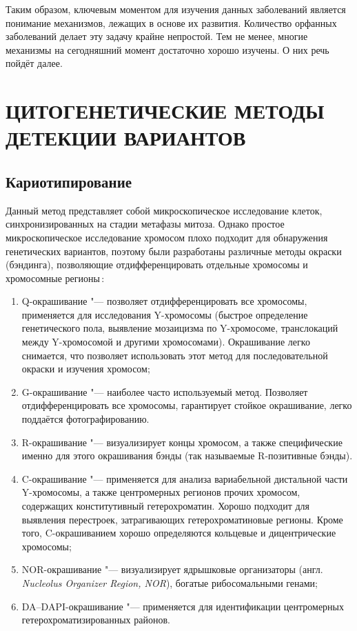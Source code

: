 \documentclass[12pt, twoside, a4paper]{article}
\newcommand{\engterm}[1]{англ. \textenglish{\textit{#1}}}
\begin{document}
Таким образом, ключевым моментом для изучения данных заболеваний является понимание механизмов, лежащих в основе их развития.
Количество орфанных заболеваний делает эту задачу крайне непростой.
Тем не менее, многие механизмы на сегодняшний момент достаточно хорошо изучены.
О них речь пойдёт далее.

\section*{ЦИТОГЕНЕТИЧЕСКИЕ МЕТОДЫ ДЕТЕКЦИИ ВАРИАНТОВ}

\subsection*{Кариотипирование}

Данный метод представляет собой микроскопическое исследование клеток, синхронизированных на стадии метафазы митоза.
Однако простое микроскопическое исследование хромосом плохо подходит для обнаружения генетических вариантов, поэтому были разработаны различные методы окраски (бэндинга), позволяющие отдифференцировать отдельные хромосомы и хромосомные регионы\,\cite{Schreck_2001}:

\begin{enumerate}
	\item Q-окрашивание "--- позволяет отдифференцировать все хромосомы, применяется для исследования Y-хромосомы (быстрое определение генетического пола, выявление мозаицизма по Y-хромосоме, транслокаций между Y-хромосомой и другими хромосомами).
	      Окрашивание легко снимается, что позволяет использовать этот метод для последовательной окраски и изучения хромосом;
	\item G-окрашивание "--- наиболее часто используемый метод.
	      Позволяет отдифференцировать все хромосомы, гарантирует стойкое окрашивание, легко поддаётся фотографированию.
	\item R-окрашивание "--- визуализирует концы хромосом, а также специфические именно для этого окрашивания бэнды (так называемые R\hyp{}позитивные бэнды).
	\item C-окрашивание "--- применяется для анализа вариабельной дистальной части Y-хромосомы, а также центромерных регионов прочих хромосом, содержащих конститутивный гетерохроматин.
	      Хорошо подходит для выявления перестроек, затрагивающих гетерохроматиновые регионы.
	      Кроме того, C-окрашиванием хорошо определяются кольцевые и дицентрические хромосомы;
	\item NOR-окрашивание "--- визуализирует ядрышковые организаторы (\engterm{Nucleolus Organizer Region, NOR}), богатые рибосомальными генами;
	\item DA--DAPI-окрашивание "--- применяется для идентификации центромерных гетерохроматизированных районов.
\end{enumerate}
\end{document}
